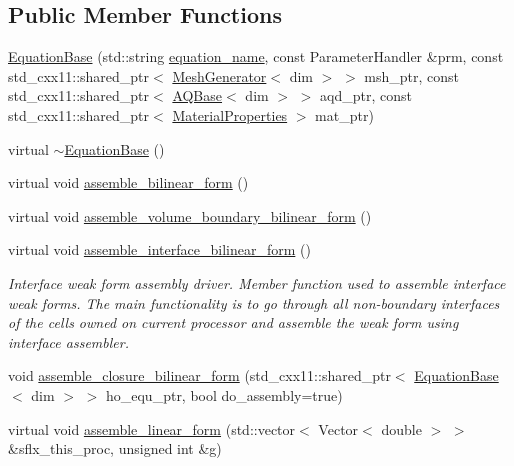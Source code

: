 \subsection*{Public Member Functions}
\begin{DoxyCompactItemize}
\item 
\hyperlink{class_equation_base_a1e027696da2ab5a030daa34bf99430fe}{Equation\+Base} (std\+::string \hyperlink{class_equation_base_a0a72472959e531f5256400dec911f3a5}{equation\+\_\+name}, const Parameter\+Handler \&prm, const std\+\_\+cxx11\+::shared\+\_\+ptr$<$ \hyperlink{class_mesh_generator}{Mesh\+Generator}$<$ dim $>$ $>$ msh\+\_\+ptr, const std\+\_\+cxx11\+::shared\+\_\+ptr$<$ \hyperlink{class_a_q_base}{A\+Q\+Base}$<$ dim $>$ $>$ aqd\+\_\+ptr, const std\+\_\+cxx11\+::shared\+\_\+ptr$<$ \hyperlink{class_material_properties}{Material\+Properties} $>$ mat\+\_\+ptr)
\item 
virtual \hyperlink{class_equation_base_aee6cf5fc2a1580bb6070babdab0626ab}{$\sim$\+Equation\+Base} ()
\item 
virtual void \hyperlink{class_equation_base_a7d4047f59b31ef73ef404ab396712878}{assemble\+\_\+bilinear\+\_\+form} ()
\item 
virtual void \hyperlink{class_equation_base_a42472101cbaeab32d22c4e8ff1dc9830}{assemble\+\_\+volume\+\_\+boundary\+\_\+bilinear\+\_\+form} ()
\item 
virtual void \hyperlink{class_equation_base_ac590b2065d95ea03fcf411c965e6cfd9}{assemble\+\_\+interface\+\_\+bilinear\+\_\+form} ()
\begin{DoxyCompactList}\small\item\em Interface weak form assembly driver. Member function used to assemble interface weak forms. The main functionality is to go through all non-\/boundary interfaces of the cells owned on current processor and assemble the weak form using interface assembler. \end{DoxyCompactList}\item 
void \hyperlink{class_equation_base_a44faf34fc306d85f5e84e9c16bea985d}{assemble\+\_\+closure\+\_\+bilinear\+\_\+form} (std\+\_\+cxx11\+::shared\+\_\+ptr$<$ \hyperlink{class_equation_base}{Equation\+Base}$<$ dim $>$ $>$ ho\+\_\+equ\+\_\+ptr, bool do\+\_\+assembly=true)
\item 
virtual void \hyperlink{class_equation_base_ac08c0b8c03ccd29f0b9eb49f6e63f8e9}{assemble\+\_\+linear\+\_\+form} (std\+::vector$<$ Vector$<$ double $>$ $>$ \&sflx\+\_\+this\+\_\+proc, unsigned int \&g)
\item 

\end{DoxyCompactItemize}
